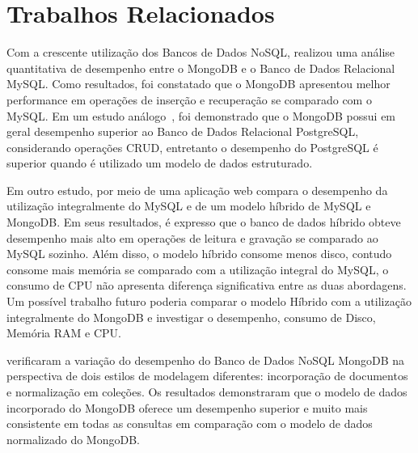 \documentclass[12pt]{article}
\begin{document}


\section{Trabalhos Relacionados} 
\label{section:relacionados}

Com a crescente utilização dos Bancos de Dados NoSQL, \cite{patil:2017} realizou uma análise quantitativa de desempenho entre o MongoDB e o Banco de Dados Relacional MySQL. Como resultados, foi constatado que o MongoDB apresentou melhor performance em operações de inserção e recuperação se comparado com o MySQL. Em um estudo análogo~\cite{jung:2015}, foi demonstrado que o MongoDB possui em geral desempenho superior ao Banco de Dados Relacional PostgreSQL, considerando operações CRUD, entretanto o desempenho do PostgreSQL é superior quando é utilizado um modelo de dados estruturado.

Em outro estudo, \cite{ongo:2018} por meio de uma aplicação web compara o desempenho da utilização integralmente do MySQL e de um modelo híbrido de MySQL e MongoDB. Em seus resultados, é expresso que o banco de dados híbrido obteve desempenho mais alto em operações de leitura e gravação se comparado ao MySQL sozinho. Além disso, o modelo híbrido consome menos disco, contudo consome mais memória se comparado com a utilização integral do MySQL, o consumo de CPU não apresenta diferença significativa entre as duas abordagens. Um possível trabalho futuro poderia comparar o modelo Híbrido com a utilização integralmente do MongoDB e investigar o desempenho, consumo de Disco, Memória RAM e CPU.

\cite{kanade2014study} verificaram a variação do desempenho do Banco de Dados NoSQL MongoDB na perspectiva de dois estilos de modelagem diferentes: incorporação de documentos e normalização em coleções. Os resultados demonstraram que o modelo de dados incorporado do MongoDB oferece um desempenho superior e muito mais consistente em todas as consultas em comparação com o modelo de dados normalizado do MongoDB.
\end{document}
